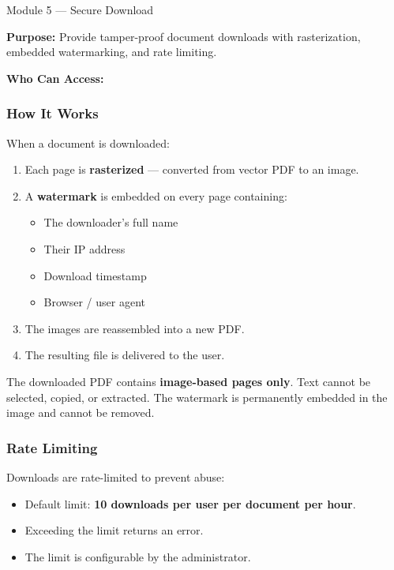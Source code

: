 \vspace{10pt}

\begin{ugModule}{Module 5 --- Secure Download}

  \textbf{Purpose:}
  Provide tamper-proof document downloads with rasterization,
  embedded watermarking, and rate limiting.

  \textbf{Who Can Access:}
     

  \subsubsection*{How It Works}
  When a document is downloaded:
  \begin{enumerate}[leftmargin=18pt]
    \item Each page is \textbf{rasterized} --- converted from
          vector PDF to an image.
    \item A \textbf{watermark} is embedded on every page
          containing:
          \begin{itemize}[leftmargin=14pt]
            \item The downloader's full name
            \item Their IP address
            \item Download timestamp
            \item Browser / user agent
          \end{itemize}
    \item The images are reassembled into a new PDF.
    \item The resulting file is delivered to the user.
  \end{enumerate}

  \begin{ugImportant}
    The downloaded PDF contains \textbf{image-based pages only}.
    Text cannot be selected, copied, or extracted. The watermark
    is permanently embedded in the image and cannot be removed.
  \end{ugImportant}

  \subsubsection*{Rate Limiting}
  Downloads are rate-limited to prevent abuse:
  \begin{itemize}[leftmargin=18pt]
    \item Default limit: \textbf{10 downloads per user per
          document per hour}.
    \item Exceeding the limit returns an error.
    \item The limit is configurable by the administrator.
  \end{itemize}


\end{ugModule}
